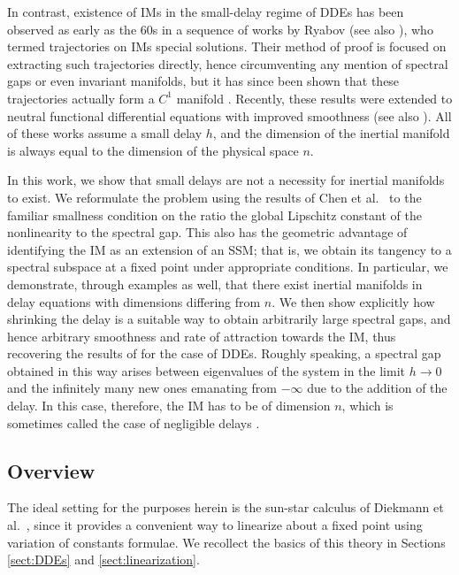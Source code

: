 \documentclass[a4paper, 12pt, oneside, reqno, notitlepage]{amsart}
\theoremstyle{plain}
\theoremstyle{definition}
\theoremstyle{remark}
\begin{document}
In contrast, existence of IMs in the small-delay regime of DDEs has been observed as early as the 60s   in a sequence of works by Ryabov \cite{ryabov1960application,ryabov1960application2,ryabov1961application,ryabov1963certain} (see also \cite{driver1968ryabov,driver1976linear,chicone2003inertial}), who termed trajectories on IMs special solutions.
Their method of proof is focused on extracting such trajectories directly, hence circumventing any mention of spectral gaps or even invariant manifolds, but it has since been shown that these trajectories actually form a $C^1$ manifold \cite{chicone2003inertial}.
Recently, these results were extended to neutral functional differential equations \cite{chen2022smooth} with improved smoothness (see also \cite{anikushin2023frequency}).
All of these works assume a small delay $h$, and the dimension of the inertial manifold is always equal to the dimension of the physical space $n$.


In this work, we show that small delays are not a necessity for inertial manifolds to exist. 
We reformulate the problem using the results of Chen et al.~\cite{chen1997invariant} to the familiar smallness condition on the ratio the global Lipschitz constant of the nonlinearity to the spectral gap.
This also has the geometric advantage of identifying the IM as an extension of an SSM;
that is, we obtain its tangency to a spectral subspace at a fixed point under appropriate conditions.
In particular, we demonstrate, through examples as well, that there exist inertial manifolds in delay equations with dimensions differing from $n$.
We then show explicitly how shrinking the delay is a suitable way to obtain arbitrarily large spectral gaps, and hence arbitrary smoothness and rate of attraction towards the IM, thus recovering the results of \cite{chen2022smooth} for the case of DDEs.
Roughly speaking, a spectral gap obtained in this way arises between eigenvalues of the system in the limit $h \to 0$ and the infinitely many new ones emanating from $-\infty$ due to the addition of the delay.
In this case, therefore, the IM has to be of dimension $n$, which is sometimes called the case of negligible delays \cite{kurzweil2006small}.



\subsection{Overview}

The ideal setting for the purposes herein is the sun-star calculus of Diekmann et al.~\cite{diekmann2012delay}, since it provides a convenient way to 
linearize about a fixed point using variation of constants formulae.
We recollect the basics of this theory in Sections \ref{sect:DDEs} and \ref{sect:linearization}.
\end{document}

